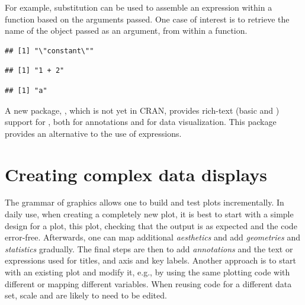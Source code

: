 \documentclass[krantz2]{krantz}\usepackage{knitr}
\begin{document}
For example, substitution can be used to assemble an expression within a function based on the arguments passed. One case of interest is to retrieve the name of the object passed as an argument, from within a function.

\begin{knitrout}\footnotesize
{}\color{fgcolor}\begin{kframe}
\begin{alltt}
 \hlkwb{<-} \hlstd{(}\hlstd{) \{}
  \hlstd{(}\hlstd{(}
\hlstd{\}}

 \hlkwb{<-} 

\hlstd{(}\hlstd{)}
\end{alltt}
\begin{verbatim}
## [1] "\"constant\""
\end{verbatim}
\begin{alltt}
\hlstd{(} \hlopt{+} \hlstd{)}
\end{alltt}
\begin{verbatim}
## [1] "1 + 2"
\end{verbatim}
\begin{alltt}
\end{alltt}
\begin{verbatim}
## [1] "a"
\end{verbatim}
\end{kframe}
\end{knitrout}

\begin{infobox}
A new package, , which is not yet in CRAN, provides rich-text (basic  and ) support for \ggplot, both for annotations and for data visualization. This package provides an alternative to the use of \Rlang expressions.
\end{infobox}

\section{Creating complex data displays}\label{sec:plot:composition}

The grammar of graphics allows one to build and test plots incrementally. In daily use, when creating a completely new plot, it is best to start with a simple design for a plot,  this plot, checking that the output is as expected and the code error-free. Afterwards, one can map additional \emph{aesthetics} and add \emph{geometries} and \emph{statistics} gradually. The final steps are then to add \emph{annotations} and the text or expressions used for titles, and axis and key labels. Another approach is to start with an existing plot and modify it, e.g.,  by using the same plotting code with different  or mapping different variables. When reusing code for a different data set, scale  and  are likely to need to be edited.
\end{document}
